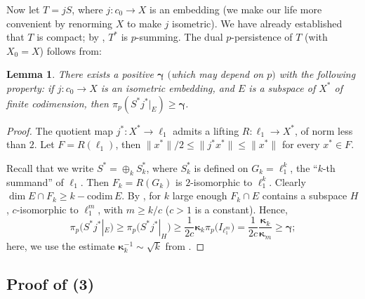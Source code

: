\documentclass{amsart}
\theoremstyle{plain}
\newtheorem{lemma}[theorem]{Lemma}
\theoremstyle{definition}
\newtheorem{remark}[theorem]{Remark}
\numberwithin{equation}{section}
\newcommand{\N}{\mathbb{N}}
\newcommand{\codim}{\mathrm{codim} \, }
\begin{document}

Now let $T = jS$, where $j : c_0 \to X$ is an embedding (we make our life more convenient by renorming $X$ to make $j$ isometric).
We have already established that $T$ is compact; by , $T^*$ is $p$-summing. The dual $p$-persistence of $T$ (with $X_0 = X$) follows from:

\begin{lemma}\label{p-sum lower est}
 There exists a positive ${\boldsymbol{\gamma}}$ $($which may depend on $p)$ with the following property: if $j : c_0 \to X$ is an isometric embedding, and $E$ is a subspace of $X^*$ of finite codimension, then $\pi_p(S^* j^*|_E) \geq {\boldsymbol{\gamma}}$.
\end{lemma}



\begin{proof}
The quotient map $j^* : X^* \to \ell_1$ admits a lifting $R : \ell_1 \to X^*$, of norm less than $2$. Let $F = R(\ell_1)$, then $\|x^*\|/2 \leq \|j^* x^*\| \leq \|x^*\|$ for every $x^* \in F$. 

Recall that we write $S^* = \oplus_k S_k^*$, where $S_k^*$ is defined on $G_k = \ell_1^k$, the ``$k$-th summand'' of $\ell_1$. Then $F_k = R(G_k)$ is $2$-isomorphic to $\ell_1^k$. Clearly $\dim E \cap F_k \geq k - \codim E$.
By \cite[Theorem 2.1]{GTT}, for $k$ large enough $F_k \cap E$ contains a subspace $H$, $c$-isomorphic to $\ell_1^m$, with $m \geq k/c$ ($c > 1$ is a constant). Hence,
$$
\pi_p \big(S^* j^*|_E\big) \geq \pi_p \big( S^* j^* |_H \big) \geq \frac1{2c} {\boldsymbol{\kappa}}_k \pi_p \big(I_{\ell_1^m}\big) = \frac1{2c} \frac{{\boldsymbol{\kappa}}_k}{{\boldsymbol{\kappa}}_m} \geq {\boldsymbol{\gamma}} ; 
$$
here, we use the estimate ${\boldsymbol{\kappa}}_k^{-1} \sim \sqrt{k}$ from .
\end{proof}


\subsection{Proof of (3)}
\end{document}
